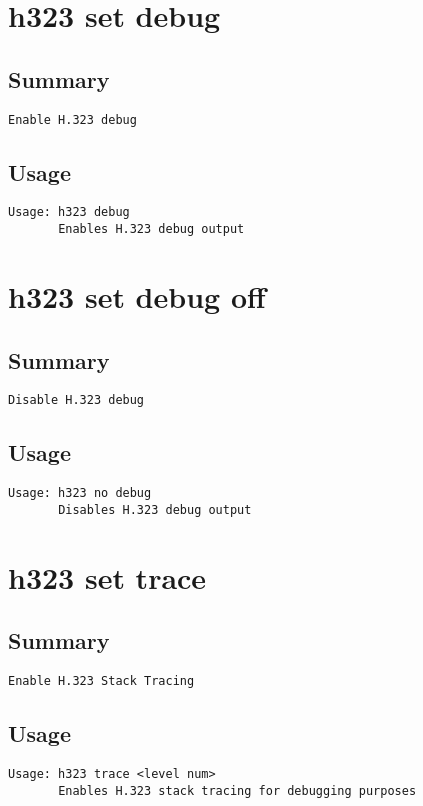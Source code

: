 \section{h323 set debug}
\subsection{Summary}
\begin{verbatim}
Enable H.323 debug
\end{verbatim}
\subsection{Usage}
\begin{verbatim}
Usage: h323 debug
       Enables H.323 debug output

\end{verbatim}


\section{h323 set debug off}
\subsection{Summary}
\begin{verbatim}
Disable H.323 debug
\end{verbatim}
\subsection{Usage}
\begin{verbatim}
Usage: h323 no debug
       Disables H.323 debug output

\end{verbatim}


\section{h323 set trace}
\subsection{Summary}
\begin{verbatim}
Enable H.323 Stack Tracing
\end{verbatim}
\subsection{Usage}
\begin{verbatim}
Usage: h323 trace <level num>
       Enables H.323 stack tracing for debugging purposes

\end{verbatim}


